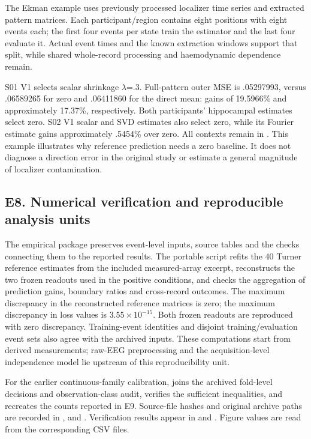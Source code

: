 \documentclass[11pt,a4paper]{article}
\begin{document}
The Ekman example uses previously processed localizer time series and
extracted pattern matrices. Each participant/region contains eight
positions with eight events each; the first four events per state train
the estimator and the last four evaluate it. Actual event times and the
known extraction windows support that split, while shared whole-record
processing and haemodynamic dependence remain.

S01 V1 selects scalar shrinkage \(\lambda\)=.3. Full-pattern outer MSE
is .05297993, versus .06589265 for zero and .06411860 for the direct
mean: gains of 19.5966\% and approximately 17.37\%, respectively. Both
participants' hippocampal estimates select zero. S02 V1 scalar and SVD
estimates also select zero, while its Fourier estimate gains
approximately .5454\% over zero. All contexts remain in
. This example
illustrates why reference prediction needs a zero baseline. It does not
diagnose a direction error in the original study or estimate a general
magnitude of localizer contamination.

\subsection{E8. Numerical verification and reproducible analysis
units}\label{e8.-numerical-verification-and-reproducible-analysis-units}

The empirical package preserves event-level inputs, source tables and
the checks connecting them to the reported results. The portable script
 refits the 40 Turner
reference estimates from the included measured-array excerpt,
reconstructs the two frozen readouts used in the positive conditions,
and checks the aggregation of prediction gains, boundary ratios and
cross-record outcomes. The maximum discrepancy in the reconstructed
reference matrices is zero; the maximum discrepancy in loss values is
\(3.55\times10^{-15}\). Both frozen readouts are reproduced with zero
discrepancy. Training-event identities and disjoint training/evaluation
event sets also agree with the archived inputs. These computations start
from derived measurements; raw-EEG preprocessing and the
acquisition-level independence model lie upstream of this
reproducibility unit.

For the earlier continuous-family calibration,
 joins the archived fold-level
decisions and observation-class audit, verifies the sufficient
inequalities, and recreates the counts reported in E9. Source-file
hashes and original archive paths are recorded in
,
 and
. Verification results
appear in  and
. Figure values are read from the
corresponding CSV files.
\end{document}
